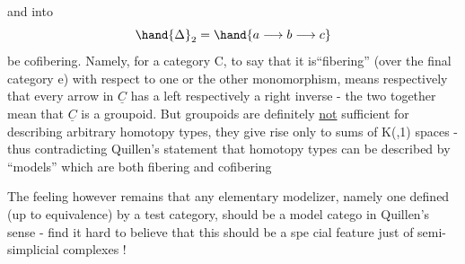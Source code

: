  \quad and \quad {}
into
\[ \hand{\Delta}_2 = \hand{a\longrightarrow b\longrightarrow c} \]
be cofibering. Namely, for a category C, to say that it is``fibering''
(over the final category e) with respect to one or the other monomorphism,
means respectively that every arrow in $\underline{C}$ has a left respectively a right
inverse - the two together mean that $\underline{C}$ is a groupoid. But groupoids are
definitely \uline{not} sufficient for describing arbitrary homotopy types, they
give rise only to sums of K(\hand{$\pi$},1) spaces \xout{\unsure{(}} - thus contradicting Quillen's
statement that homotopy types can be described by ``models'' which are both
fibering and cofibering\hand{!}

The feeling however remains that any elementary modelizer, namely one
defined (up to equivalence) by a test category, should be a  model catego
in Quillen's sense -  find it hard to believe that this should be a spe%
cial feature just of semi-simplicial complexes !

